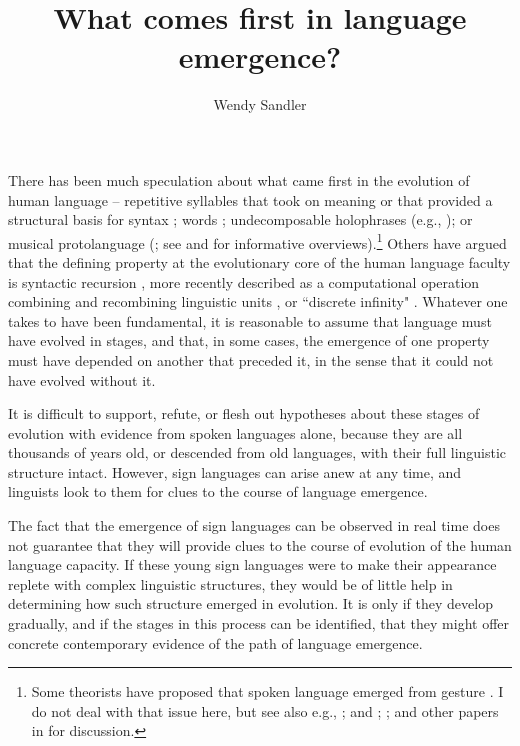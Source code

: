 \documentclass[output=paper]{langsci/langscibook}
\author{Wendy Sandler\affiliation{University of Haifa}}
\title{What comes first in language emergence?}
\begin{document}
 
       \noindent There has been much speculation about what came first in the evolution of human language -- repetitive syllables that took on meaning \citep{MacNeilage1998} or that provided a structural basis for syntax \citep{Carstairs-McCarthy1999}; words \citep{Bickerton1990,Jackendoff1999}; undecomposable holophrases (e.g., \citealt{Arbib2012}); or musical protolanguage (\citealt{Darwin1871,Fitch2010}; see \citealt{Newmeyer2002} and \citealt{Fitch2005} for informative overviews).\footnote{Some theorists have proposed that spoken language emerged from gesture \citep{Corballis2002,Armstrong1995,Arbib2012}. I do not deal with that issue here, but see also e.g., \citet{MacNeilage1998}; and \citet{Sandler2013}; \citet{Emmorey2013}; and other papers in \citet{Kemmerer2013} for discussion.  }  Others have argued that the defining property at the evolutionary core of the human language faculty is syntactic recursion \citep{Hauser2002}, more recently described as a computational operation combining and recombining linguistic units \citep{Bolhuis2014}, or ``discrete infinity" \citep{Hauser2014}.  Whatever one takes to have been fundamental, it is reasonable to assume that language must have evolved in stages, and that, in some cases, the emergence of one property must have depended on another that preceded it, in the sense that it could not have evolved without it. 

 It is difficult to support, refute, or flesh out hypotheses about these stages of evolution with evidence from spoken languages alone, because they are all thousands of years old, or descended from old languages, with their full linguistic structure intact.  However, sign languages can arise anew at any time, and linguists look to them for clues to the course of language emergence.  

  The fact that the emergence of sign languages can be observed in real time does not guarantee that they will provide clues to the course of evolution of the human language capacity.  If these young sign languages were to make their appearance replete with complex linguistic structures, they would be of little help in determining how such structure emerged in evolution.  It is only if they develop gradually, and if the stages in this process can be identified, that they might offer concrete contemporary evidence of the path of language emergence.  
\end{document}
